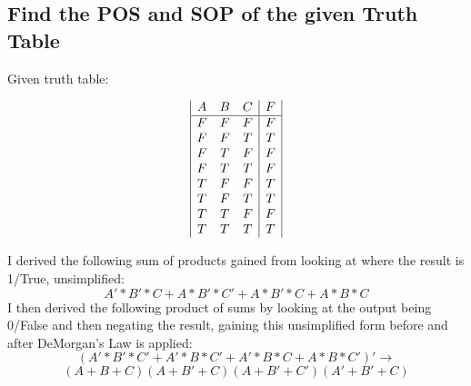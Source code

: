 \subsection{Find the POS and SOP of the given Truth Table}
Given truth table:
\begin{center}
    \begin{displaymath}
    \begin{array}{|c c c|c|}
      A & B & C & F \\
    \hline
      F & F & F & F \\
      F & F & T & T \\
      F & T & F & F \\
      F & T & T & F \\
      T & F & F & T \\
      T & F & T & T \\
      T & T & F & F \\
      T & T & T & T \\
    \end{array}
    \end{displaymath}
\end{center}
I derived the following sum of products gained from looking at where the result is 1/True, unsimplified:
$$ A'*B'*C + A*B'*C' + A*B'*C + A*B*C $$
I then derived the following product of sums by looking at the output being 0/False and then negating the result, gaining this unsimplified form before and after DeMorgan's Law is applied:
$$ (A'*B'*C' + A'*B*C' + A'*B*C + A*B*C')' \rightarrow$$
$$ (A+B+C)(A+B'+C)(A+B'+C')(A'+B'+C) $$


